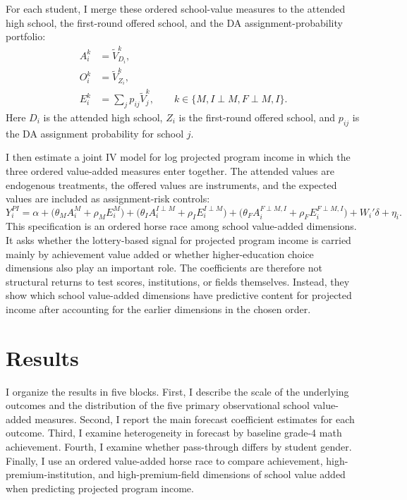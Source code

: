 \documentclass[a4paper, article, english, oneside, unknownkeysallowed, 12pt]{memoir}
\begin{document}
For each student, I merge these ordered school-value measures to the attended high school, the first-round offered school, and the DA assignment-probability portfolio:
\begin{equation}
  \begin{aligned}
  A_i^k &= \widetilde{V}_{D_i}^{k},\\
  O_i^k &= \widetilde{V}_{Z_i}^{k},\\
  E_i^k &= \sum_j p_{ij}\widetilde{V}_{j}^{k},
  \qquad k \in \{M,I \perp M,F \perp M,I\}.
  \end{aligned}
  \label{eq:ordered-va-objects}
\end{equation}
Here $D_i$ is the attended high school, $Z_i$ is the first-round offered school, and $p_{ij}$ is the DA assignment probability for school $j$.

I then estimate a joint IV model for log projected program income in which the three ordered value-added measures enter together.
The attended values are endogenous treatments, the offered values are instruments, and the expected values are included as assignment-risk controls:
\begin{equation}
  Y_i^{PI} =
  \alpha
  + \big( 
    \theta_M A_i^{M}
  + \rho_M E_i^{M} 
    \big) 
  + \big( 
   \theta_I A_i^{I \perp M}
  + \rho_I E_i^{I \perp M}
    \big) 
  + \big(   
   \theta_F A_i^{F \perp M,I}
  + \rho_F E_i^{F \perp M,I}
      \big) 
  + W_i'\delta
  + \eta_i.
  \label{eq:ordered-va-iv}
\end{equation}
This specification is an ordered horse race among school value-added dimensions.
It asks whether the lottery-based signal for projected program income is carried mainly by achievement value added or whether higher-education choice dimensions also play an important role.
The coefficients are therefore not structural returns to test scores, institutions, or fields themselves.
Instead, they show which school value-added dimensions have predictive content for projected income after accounting for the earlier dimensions in the chosen order.


\clearpage 
\section{Results}

I organize the results in five blocks.
First, I describe the scale of the underlying outcomes and the distribution of the five primary observational school value-added measures.
Second, I report the main forecast coefficient estimates for each outcome.
Third, I examine heterogeneity in forecast by baseline grade-4 math achievement.
Fourth, I examine whether pass-through differs by student gender.
Finally, I use an ordered value-added horse race to compare achievement, high-premium-institution, and high-premium-field dimensions of school value added when predicting projected program income.
\end{document}
